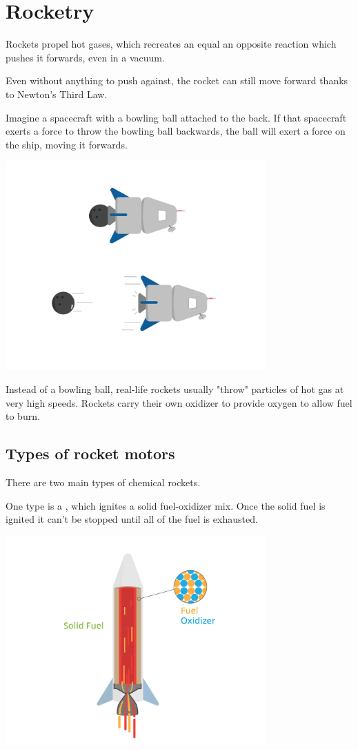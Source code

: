 \chapter{Rocketry}


Rockets propel hot gases, which recreates an equal an opposite reaction which pushes it forwards, even in a vacuum. 

Even without anything to push against, the rocket can still move forward thanks to Newton's Third Law. 

Imagine a spacecraft with a bowling ball attached to the back. If that spacecraft exerts a force to throw the bowling ball backwards, the ball will exert a force on the ship, moving it forwards. 


\includegraphics[width=0.75\textwidth]{thirdLaw.png}

Instead of a bowling ball, real-life rockets usually "throw" particles of hot gas at very high speeds. Rockets carry their own oxidizer to provide oxygen to allow fuel to burn. 

\section{Types of rocket motors}

There are two main types of chemical rockets. 

One type is a , which ignites a solid fuel-oxidizer mix. Once the solid fuel is ignited it can't be stopped until all of the fuel is exhausted.


\includegraphics[width=0.75\textwidth]{solid.png}

